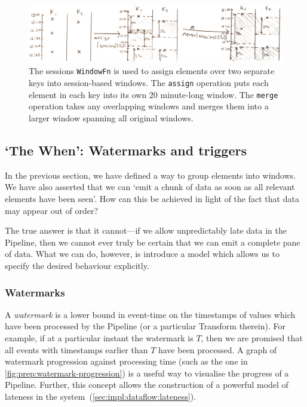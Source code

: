 \begin{figure}[h]
	\includegraphics[width=\textwidth]{images/temp/sessions-assign-merge}
	\caption[A \texttt{WindowFn} is used to place elements into session-based, unaligned windows.]
	{The sessions \texttt{WindowFn} is used to assign elements over two separate keys into session-based windows. The \texttt{assign} operation puts each element in each key into its own 20 minute-long window. The \texttt{merge} operation takes any overlapping windows and merges them into a larger window spanning all original windows.}
	\label{fig:prep:sessions-merge}
\end{figure}


\subsection{`The When': Watermarks and triggers}\label{sec:prep:dataflow:when}

In the previous section, we have defined a way to group elements into windows.
We have also asserted that we can `emit a chunk of data as soon as all relevant elements have been seen'.
How can this be achieved in light of the fact that data may appear out of order?

The true answer is that it cannot---if we allow unpredictably late data in the Pipeline, then we cannot ever truly be certain that we can emit a complete pane of data.
What we can do, however, is introduce a model which allows us to specify the desired behaviour explicitly.

\subsubsection{Watermarks}

A \emph{watermark} is a lower bound in event-time on the timestamps of values which have been processed by the Pipeline (or a particular Transform therein).
For example, if at a particular instant the watermark is $T$, then we are promised that all events with timestamps earlier than $T$ have been processed.
A graph of watermark progression against processing time (such as the one in \cref{fig:prep:watermark-progression}) is a useful way to visualise the progress of a Pipeline.
Further, this concept allows the construction of a powerful model of lateness in the system~(\cref{sec:impl:dataflow:lateness}).


